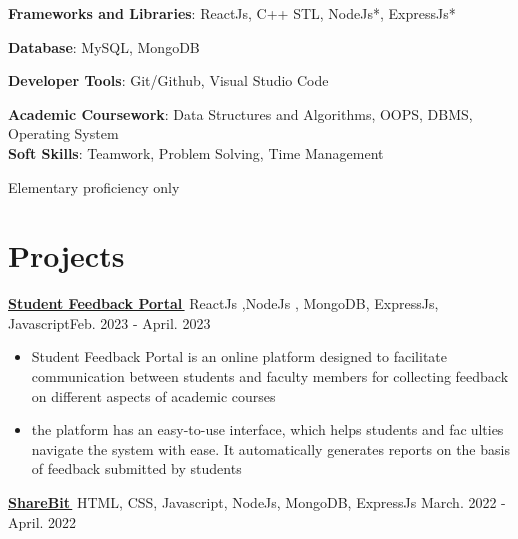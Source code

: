 \documentclass[letterpaper,11pt]{article}
\let\orighref\href
\renewcommand{\href}[2]{\orighref{#1}{#2\,\faExternalLink}}
\begin{document}
     \textbf{Frameworks and Libraries}{: ReactJs, C++ STL, NodeJs*, ExpressJs*}\\
     {
     \textbf{Database}{: MySQL, MongoDB }\\
     {
     \textbf{Developer Tools}{: Git/Github, Visual Studio Code }
     
     {
     \textbf{Academic Coursework}{: Data Structures and Algorithms, OOPS, DBMS, Operating System}\\
      \textbf{Soft Skills}{: Teamwork, Problem Solving, Time Management}
     
     {\vspace{4}\small*Elementary proficiency only}
     
    
      
   
 


\section{Projects}
 

   {  \textbf{\href{https://student-feedback-template-aibu-hd2bplw22-shankar9834.vercel.app/viewFeedbacks}{Student Feedback Portal}}   \mid ReactJs ,NodeJs , MongoDB, ExpressJs, Javascript\hfill {Feb. 2023 - April. 2023}}\\
    
     
      \smallskip
    \begin{itemize}[noitemsep]
   
        \item Student Feedback Portal is an online platform designed to facilitate
communication between students and faculty members for collecting
feedback on different aspects of academic courses
\item the platform has an easy-to-use interface, which helps students and faculties navigate the system with ease. It automatically generates reports on
the basis of feedback submitted by students
       
        
         
    \end{itemize}
    \smallskip
    \vspace{5}
    
    \textbf{\href{https://github.com/shankar9834/ShareBit}{ShareBit}}  \mid HTML, CSS, Javascript, NodeJs, MongoDB, ExpressJs \hfill {March. 2022 - April. 2022} \\
    
}}}
\end{document}
